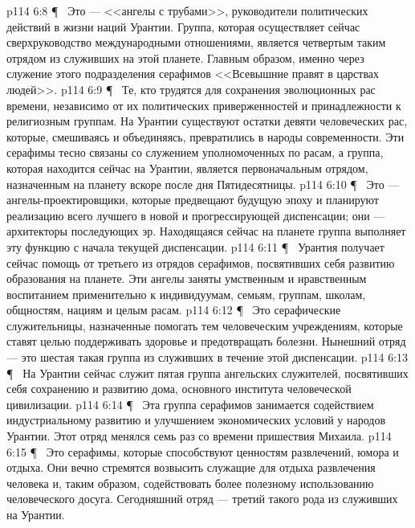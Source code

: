 \vs p114 6:8 \P\ \bibnobreakspace {} Это --- <<ангелы с трубами>>, руководители политических действий в жизни наций Урантии. Группа, которая осуществляет сейчас сверхруководство международными отношениями, является четвертым таким отрядом из служивших на этой планете. Главным образом, именно через служение этого подразделения серафимов <<Всевышние правят в царствах людей>>.
\vs p114 6:9 \P\ \bibnobreakspace {} Те, кто трудятся для сохранения эволюционных рас времени, независимо от их политических приверженностей и принадлежности к религиозным группам. На Урантии существуют остатки девяти человеческих рас, которые, смешиваясь и объединяясь, превратились в народы современности. Эти серафимы тесно связаны со служением уполномоченных по расам, а группа, которая находится сейчас на Урантии, является первоначальным отрядом, назначенным на планету вскоре после дня Пятидесятницы.
\vs p114 6:10 \P\ \bibnobreakspace {} Это --- ангелы\hyp{}проектировщики, которые предвещают будущую эпоху и планируют реализацию всего лучшего в новой и прогрессирующей диспенсации; они --- архитекторы последующих эр. Находящаяся сейчас на планете группа выполняет эту функцию с начала текущей диспенсации.
\vs p114 6:11 \P\ \bibnobreakspace {} Урантия получает сейчас помощь от третьего из отрядов серафимов, посвятивших себя развитию образования на планете. Эти ангелы заняты умственным и нравственным воспитанием применительно к индивидуумам, семьям, группам, школам, общностям, нациям и целым расам.
\vs p114 6:12 \P\ \bibnobreakspace {} Это серафические служительницы, назначенные помогать тем человеческим учреждениям, которые ставят целью поддерживать здоровье и предотвращать болезни. Нынешний отряд --- это шестая такая группа из служивших в течение этой диспенсации.
\vs p114 6:13 \P\ \bibnobreakspace {} На Урантии сейчас служит пятая группа ангельских служителей, посвятивших себя сохранению и развитию дома, основного института человеческой цивилизации.
\vs p114 6:14 \P\ \bibnobreakspace {} Эта группа серафимов занимается содействием индустриальному развитию и улучшением экономических условий у народов Урантии. Этот отряд менялся семь раз со времени пришествия Михаила.
\vs p114 6:15 \P\ \bibnobreakspace {} Это серафимы, которые способствуют ценностям развлечений, юмора и отдыха. Они вечно стремятся возвысить служащие для отдыха развлечения человека и, таким образом, содействовать более полезному использованию человеческого досуга. Сегодняшний отряд --- третий такого рода из служивших на Урантии.
